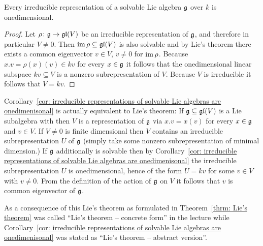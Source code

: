 \begin{cor}\label{cor: irreducible representations of solvable Lie algebras are onedimenisonal}
 Every irreducible representation of a solvable Lie algebra $\mathfrak{g}$ over $k$ is onedimensional.
\end{cor}
\begin{proof}
 Let $\rho \colon \mathfrak{g} \to \mathfrak{gl}(V)$ be an irreducible representation of $\mathfrak{g}$, and therefore in particular $V \neq 0$. Then $\operatorname{im} \rho \subseteq \mathfrak{gl}(V)$ is also solvable and by Lie’s theorem there exists a common eigenvector $v \in V$, $v \neq 0$ for $\operatorname{im} \rho$. Because $x.v = \rho(x)(v) \in kv$ for every $x \in \mathfrak{g}$ it follows that the onedimensional linear subspace $kv \subseteq V$ is a nonzero subrepresentation of $V$. Because $V$ is irreducible it follows that $V = kv$.
\end{proof}


\begin{rem}
 Corollary~\ref{cor: irreducible representations of solvable Lie algebras are onedimenisonal} is actually equivalent to Lie’s theorem: If $\mathfrak{g} \subseteq \mathfrak{gl}(V)$ is a Lie subalgebra with then $V$ is a representation of $\mathfrak{g}$ via $x.v = x(v)$ for every $x \in \mathfrak{g}$ and $v \in V$. If $V \neq 0$ is finite dimensional then $V$ contains an irreducible subrepresentation $U$ of $\mathfrak{g}$ (simply take some nonzero subrepresentation of minimal dimension.) If $\mathfrak{g}$ additionally is solvable then by Corollary~\ref{cor: irreducible representations of solvable Lie algebras are onedimenisonal} the irreducible subrepresentation $U$ is onedimensional, hence of the form $U = kv$ for some $v \in V$ with $v \neq 0$. From the definition of the action of $\mathfrak{g}$ on $V$ it follows that $v$ is common eigenvector of $\mathfrak{g}$.
 
 As a consequence of this Lie’s theorem as formulated in Theorem~\ref{thrm: Lie’s theorem} was called ``Lie’s theorem -- concrete form'' in the lecture while Corollary~\ref{cor: irreducible representations of solvable Lie algebras are onedimenisonal} was stated as ``Lie’s theorem -- abstract version''.
\end{rem}


